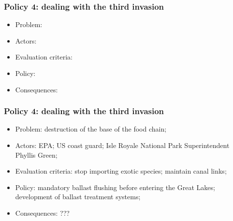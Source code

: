 \documentclass[aspectratio=169]{beamer}
\theoremstyle{principle}
\begin{document}
\begin{frame}
\frametitle{Policy 4: dealing with the third invasion}

\begin{itemize}
\item Problem: 
\bigskip
\bigskip
\item Actors: 
\bigskip
\bigskip
\item Evaluation criteria: 
\bigskip
\bigskip
\item Policy: 
\bigskip
\bigskip
\item Consequences: 
\end{itemize}
\end{frame}

\begin{frame}
\frametitle{Policy 4: dealing with the third invasion}

\begin{itemize}
\item Problem: destruction of the base of the food chain;
\bigskip
\bigskip
\item Actors: EPA; US coast guard; Isle Royale National Park Superintendent Phyllis Green;
\bigskip
\bigskip
\item Evaluation criteria: stop importing exotic species; maintain canal links;
\bigskip
\bigskip
\item Policy: mandatory ballast flushing before entering the Great Lakes; development of ballast treatment systems; 
\bigskip
\bigskip
\item Consequences: ???
\end{itemize}

\end{frame}

%
%
%
%
%
%
%
\end{document}
